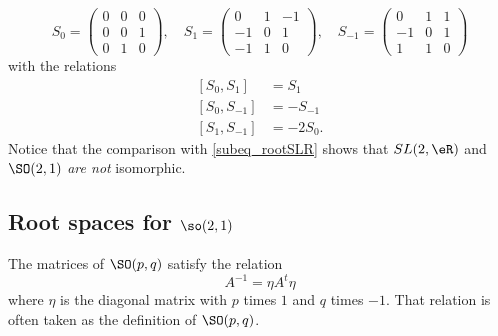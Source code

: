 \begin{equation}
S_{0}=
\begin{pmatrix}
0&0&0\\
0&0&1\\
0&1&0
\end{pmatrix},\quad
S_{1}=
\begin{pmatrix}
0&1&-1\\
-1&0&1\\
-1&1&0
\end{pmatrix},\quad
S_{-1}=
\begin{pmatrix}
0&1&1\\
-1&0&1\\
1&1&0
\end{pmatrix}
\end{equation}
with the relations
\begin{subequations}
\begin{align}
[S_{0},S_{1}]&=S_{1}\\
[S_{0},S_{-1}]&=-S_{-1}\\
[S_{1},S_{-1}]&=-2S_{0}.
\end{align}
\end{subequations}
Notice that the comparison with \eqref{subeq_rootSLR} shows that $SL(2,\eR)$ and $\SO(2,1)$ \emph{are not} isomorphic.

\subsection{Root spaces for \texorpdfstring{$\so(2,1)$}{so21}}

\begin{proposition}
	The matrices of $\SO(p,q)$ satisfy the relation
	\[ 
		A^{-1}=\eta A^t\eta
	\]
	where $\eta$ is the diagonal matrix with $p$ times $1$ and $q$ times $-1$. That relation is often taken as the definition of $\SO(p,q)$.
\end{proposition}


